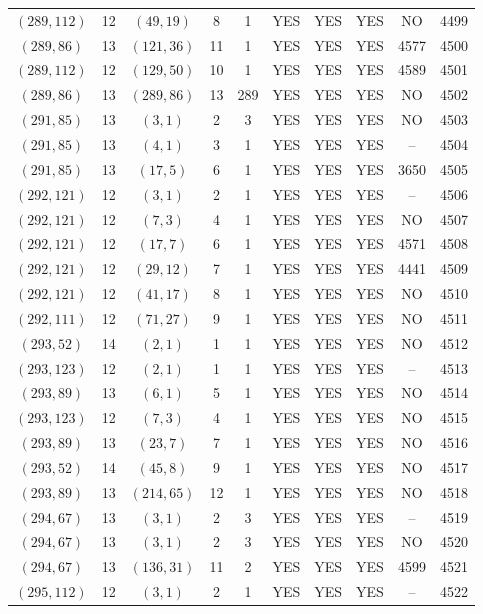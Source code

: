 \begin{longtable}{|c|c|c|c|c|c|c|c|c|c|}
$(289, 112)$ & 12 & $(49, 19)$ & 8 & 1 & YES & YES & YES & NO & 4499\\
$(289, 86)$ & 13 & $(121, 36)$ & 11 & 1 & YES & YES & YES & 4577 & 4500\\
$(289, 112)$ & 12 & $(129, 50)$ & 10 & 1 & YES & YES & YES & 4589 & 4501\\
$(289, 86)$ & 13 & $(289, 86)$ & 13 & 289 & YES & YES & YES & NO & 4502\\
$(291, 85)$ & 13 & $(3, 1)$ & 2 & 3 & YES & YES & YES & NO & 4503\\
$(291, 85)$ & 13 & $(4, 1)$ & 3 & 1 & YES & YES & YES & -- & 4504\\
$(291, 85)$ & 13 & $(17, 5)$ & 6 & 1 & YES & YES & YES & 3650 & 4505\\
$(292, 121)$ & 12 & $(3, 1)$ & 2 & 1 & YES & YES & YES & -- & 4506\\
$(292, 121)$ & 12 & $(7, 3)$ & 4 & 1 & YES & YES & YES & NO & 4507\\
$(292, 121)$ & 12 & $(17, 7)$ & 6 & 1 & YES & YES & YES & 4571 & 4508\\
$(292, 121)$ & 12 & $(29, 12)$ & 7 & 1 & YES & YES & YES & 4441 & 4509\\
$(292, 121)$ & 12 & $(41, 17)$ & 8 & 1 & YES & YES & YES & NO & 4510\\
$(292, 111)$ & 12 & $(71, 27)$ & 9 & 1 & YES & YES & YES & NO & 4511\\
$(293, 52)$ & 14 & $(2, 1)$ & 1 & 1 & YES & YES & YES & NO & 4512\\
$(293, 123)$ & 12 & $(2, 1)$ & 1 & 1 & YES & YES & YES & -- & 4513\\
$(293, 89)$ & 13 & $(6, 1)$ & 5 & 1 & YES & YES & YES & NO & 4514\\
$(293, 123)$ & 12 & $(7, 3)$ & 4 & 1 & YES & YES & YES & NO & 4515\\
$(293, 89)$ & 13 & $(23, 7)$ & 7 & 1 & YES & YES & YES & NO & 4516\\
$(293, 52)$ & 14 & $(45, 8)$ & 9 & 1 & YES & YES & YES & NO & 4517\\
$(293, 89)$ & 13 & $(214, 65)$ & 12 & 1 & YES & YES & YES & NO & 4518\\
$(294, 67)$ & 13 & $(3, 1)$ & 2 & 3 & YES & YES & YES & -- & 4519\\
$(294, 67)$ & 13 & $(3, 1)$ & 2 & 3 & YES & YES & YES & NO & 4520\\
$(294, 67)$ & 13 & $(136, 31)$ & 11 & 2 & YES & YES & YES & 4599 & 4521\\
$(295, 112)$ & 12 & $(3, 1)$ & 2 & 1 & YES & YES & YES & -- & 4522\\

\end{longtable}
